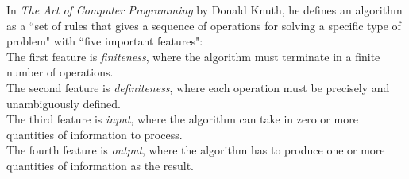 \documentclass[12pt]{article}
\newenvironment{problem}[2][Problem]{\begin{trivlist}
\item[\hskip \labelsep {\bfseries #1}\hskip \labelsep {\bfseries #2.}]}{\end{trivlist}}
\begin{document}
 \begin{problem}{1}
 In \emph{The Art of Computer Programming} by Donald Knuth, he defines an algorithm as a ``set of rules that gives a sequence of operations for solving a specific type of problem" with ``five important features":\\
 
 The first feature is \emph{finiteness}, where the algorithm must terminate in a finite number of operations. \\
 
 The second feature is \emph{definiteness}, where each operation must be precisely and unambiguously defined. \\
 
 The third feature is \emph{input}, where the algorithm can take in zero or more quantities of information to process. \\
 
 The fourth feature is \emph{output}, where the algorithm has to produce one or more quantities of information as the result.\\
 

\end{problem}
\end{document}
